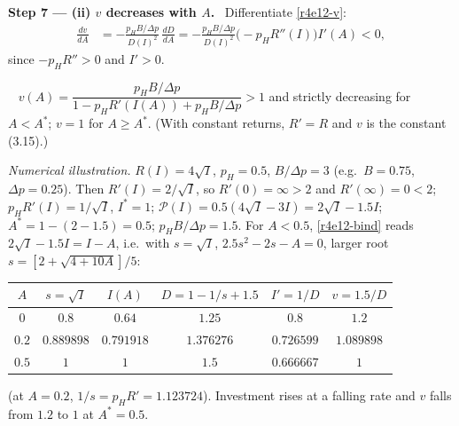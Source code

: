 \documentclass[11pt,a4paper]{article}
\newcommand{\step}[2]{\par\medskip\noindent\textbf{Step #1 --- #2.}~}
\newcommand{\answer}[1]{\par\smallskip\noindent\fbox{\textbf{Answer #1.}}~}
\begin{document}
\step{7}{(ii) $v$ decreases with $A$} Differentiate \eqref{r4e12-v}:
\begin{align}
  \frac{dv}{dA} &= -\frac{p_HB/\Delta p}{D(I)^2}\,\frac{dD}{dA}
   = -\frac{p_HB/\Delta p}{D(I)^2}\big(-p_HR''(I)\big)I'(A) < 0, \nonumber
\end{align}
since $-p_HR''>0$ and $I'>0$.

\answer{(ii)} $v(A)=\dfrac{p_HB/\Delta p}{1-p_HR'(I(A))+p_HB/\Delta p}>1$ and strictly decreasing
for $A<A^*$; $v=1$ for $A\ge A^*$. (With constant returns, $R'=R$ and $v$ is the constant
(3.15).)

\emph{Numerical illustration.} $R(I)=4\sqrt I$, $p_H=0.5$, $B/\Delta p=3$ (e.g.\ $B=0.75$,
$\Delta p=0.25$). Then $R'(I)=2/\sqrt I$, so $R'(0)=\infty>2$ and $R'(\infty)=0<2$; $p_HR'(I)=1/\sqrt I$,
$I^*=1$; $\mathcal P(I)=0.5(4\sqrt I-3I)=2\sqrt I-1.5I$; $A^*=1-(2-1.5)=0.5$; $p_HB/\Delta p=1.5$.
For $A<0.5$, \eqref{r4e12-bind} reads $2\sqrt I-1.5I=I-A$, i.e.\ with $s=\sqrt I$,
$2.5s^2-2s-A=0$, larger root $s=[2+\sqrt{4+10A}]/5$:
\begin{center}
\begin{tabular}{cccccc}
\toprule
$A$ & $s=\sqrt{I}$ & $I(A)$ & $D=1-1/s+1.5$ & $I'=1/D$ & $v=1.5/D$\\
\midrule
$0$   & $0.8$      & $0.64$     & $1.25$     & $0.8$      & $1.2$\\
$0.2$ & $0.889898$ & $0.791918$ & $1.376276$ & $0.726599$ & $1.089898$\\
$0.5$ & $1$        & $1$        & $1.5$      & $0.666667$ & $1$\\
\bottomrule
\end{tabular}
\end{center}
(at $A=0.2$, $1/s=p_HR'=1.123724$). Investment rises at a falling rate and $v$ falls from $1.2$
to $1$ at $A^*=0.5$.
\end{document}
